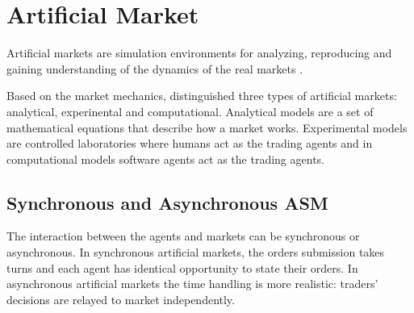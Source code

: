 \section{Artificial Market}
Artificial markets are simulation environments for analyzing, 
reproducing and gaining understanding of the dynamics of the 
real markets \citet{Julien07}. 

Based on the market mechanics, \citet{boer05} distinguished 
three types of artificial markets: analytical,
experinental and computational. Analytical models are a
set of mathematical equations that describe how a
market works. Experimental models are controlled laboratories 
where humans act as the trading agents and in computational
models software agents act as the trading agents. 

\subsection{Synchronous and Asynchronous ASM}

The interaction between the agents and markets can be synchronous
or asynchronous. In synchronous artificial markets, the orders
submission takes turns and each agent has identical opportunity
to state their orders. In asynchronous artificial markets
the time handling is more realistic: traders' decisions are 
relayed to market independently. \citep{Julien07}